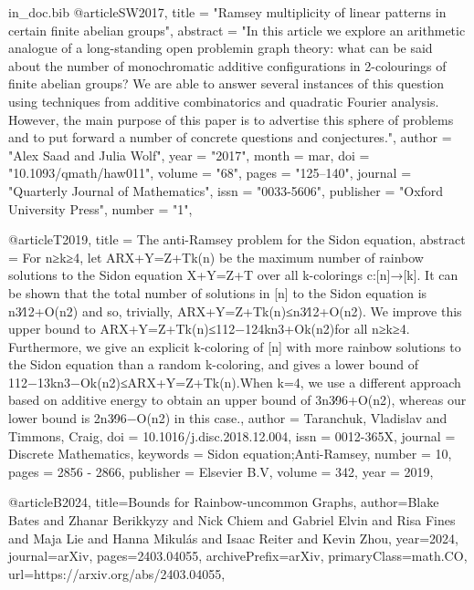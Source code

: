\begin{filecontents}{in_doc.bib}
@article{SW2017,
title = "Ramsey multiplicity of linear patterns in certain finite abelian groups",
abstract = "In this article we explore an arithmetic analogue of a long-standing open problemin graph theory: what can be said about the number of monochromatic additive configurations in 2-colourings of finite abelian groups? We are able to answer several instances of this question using techniques from additive combinatorics and quadratic Fourier analysis. However, the main purpose of this paper is to advertise this sphere of problems and to put forward a number of concrete questions and conjectures.",
author = "Alex Saad and Julia Wolf",
year = "2017",
month = mar,
doi = "10.1093/qmath/haw011",
volume = "68",
pages = "125--140",
journal = "Quarterly Journal of Mathematics",
issn = "0033-5606",
publisher = "Oxford University Press",
number = "1",
}

@article{T2019,
title = {The anti-{R}amsey problem for the {S}idon equation},
abstract = {For n≥k≥4, let ARX+Y=Z+Tk(n) be the maximum number of rainbow solutions to the Sidon equation X+Y=Z+T over all k-colorings c:[n]→[k]. It can be shown that the total number of solutions in [n] to the Sidon equation is n3∕12+O(n2) and so, trivially, ARX+Y=Z+Tk(n)≤n3∕12+O(n2). We improve this upper bound to ARX+Y=Z+Tk(n)≤112−124kn3+Ok(n2)for all n≥k≥4. Furthermore, we give an explicit k-coloring of [n] with more rainbow solutions to the Sidon equation than a random k-coloring, and gives a lower bound of 112−13kn3−Ok(n2)≤ARX+Y=Z+Tk(n).When k=4, we use a different approach based on additive energy to obtain an upper bound of 3n3∕96+O(n2), whereas our lower bound is 2n3∕96−O(n2) in this case.},
author = {Taranchuk, Vladislav and Timmons, Craig},
doi = {10.1016/j.disc.2018.12.004},
issn = {0012-365X},
journal = {Discrete Mathematics},
keywords = {Sidon equation;Anti-Ramsey},
number = {10},
pages = {2856 - 2866},
publisher = {Elsevier B.V},
volume = {342},
year = {2019},
}

@article{B2024,
      title={Bounds for Rainbow-uncommon Graphs}, 
      author={Blake Bates and Zhanar Berikkyzy and Nick Chiem and Gabriel Elvin and Risa Fines and Maja Lie and Hanna Mikulás and Isaac Reiter and Kevin Zhou},
      year={2024},
      journal={arXiv},
      pages={2403.04055},
      archivePrefix={arXiv},
      primaryClass={math.CO},
      url={https://arxiv.org/abs/2403.04055}, 
}
\end{filecontents}

\documentclass[12pt]{article}
\usepackage{amsmath,amsthm,amssymb,amstext,dsfont,fancyvrb,float,fontenc,graphicx,subfigure,hyperref, tikz}
\usepackage[utf8]{inputenc}
\usepackage[margin=1in]{geometry}

